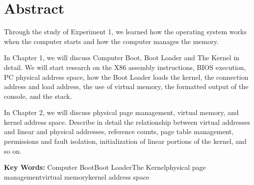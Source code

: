 \section*{ \centering \textbf{Abstract} }
Through the study of Experiment 1, we learned how the operating system works when the computer starts and how the computer manages the memory.

In Chapter 1, we will discuss Computer Boot, Boot Loader and The Kernel in detail. We will start research on the X86 assembly instructions, BIOS execution, PC physical address space, how the Boot Loader loads the kernel, the connection address and load address, the use of virtual memory, the formatted output of the console, and the stack.

In Chapter 2, we will discuss physical page management, virtual memory, and kernel address space. Describe in detail the relationship between virtual addresses and linear and physical addresses, reference counts, page table management, permissions and fault isolation, initialization of linear portions of the kernel, and so on.
\par
\vspace{3ex}
\textbf{Key Words:} Computer Boot\quad Boot Loader\quad The Kernel\quad physical page management\quad virtual memory\quad kernel address space




